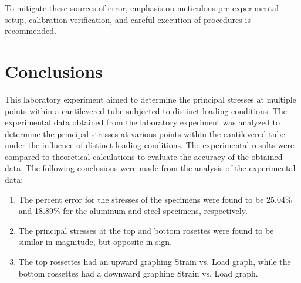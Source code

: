 \documentclass[12pt, titlepage]{article}
\begin{document}
To mitigate these sources of error, emphasis on meticulous pre-experimental
setup, calibration verification, and careful execution of procedures is
recommended.
\newpage
\section{Conclusions}
This laboratory experiment aimed to determine the principal stresses at
multiple points within a cantilevered tube subjected to distinct loading
conditions. The experimental data obtained from the laboratory experiment was
analyzed to determine the principal stresses at various points within the
cantilevered tube under the influence of distinct loading conditions. The
experimental results were compared to theoretical calculations to evaluate the
accuracy of the obtained data. The following conclusions were made from the
analysis of the experimental data:
\begin{enumerate}
  \item The percent error for the stresses of the specimens were found to be
    25.04\% and 18.89\% for the aluminum and steel specimens, respectively.
  \item The principal stresses at the top and bottom rosettes were found to be
    similar in magnitude, but opposite in sign.
  \item The top rossettes had an upward graphing Strain vs. Load graph, while
    the bottom rossettes had a downward graphing Strain vs. Load graph.
\end{enumerate}
\end{document}
